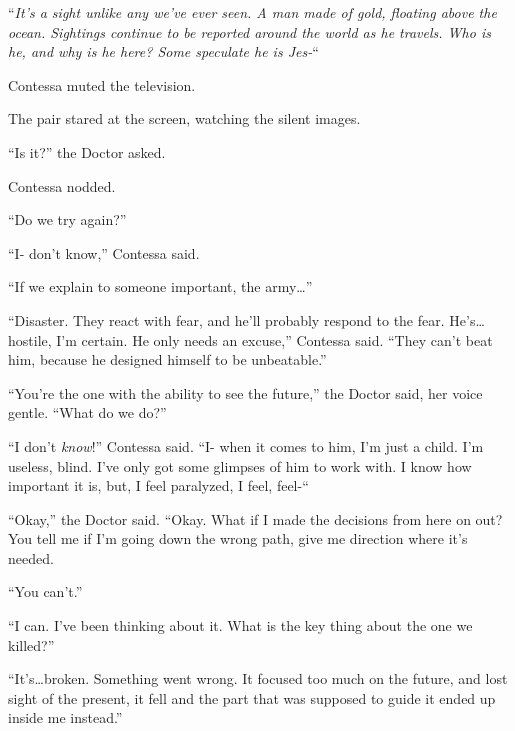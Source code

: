 \sectionbreak



``\emph{It's a sight unlike any we've ever seen.  A man made of gold, floating above the ocean.  Sightings continue to be reported around the world as he travels.  Who is he, and why is he here?  Some speculate he is Jes-}``



Contessa muted the television.



The pair stared at the screen, watching the silent images.



``Is it?''  the Doctor asked.



Contessa nodded.



``Do we try again?''



``I- don't know,'' Contessa said.



``If we explain to someone important, the army\ldots''



``Disaster.  They react with fear, and he'll probably respond to the fear.  He's\ldots hostile, I'm certain.  He only needs an excuse,'' Contessa said.  ``They can't beat him, because he designed himself to be unbeatable.''



``You're the one with the ability to see the future,'' the Doctor said, her voice gentle.  ``What do we do?''



``I don't \emph{know}!''  Contessa said.  ``I- when it comes to him, I'm just a child.  I'm useless, blind.  I've only got some glimpses of him to work with.  I know how important it is, but, I feel paralyzed, I feel, feel-``



``Okay,'' the Doctor said.  ``Okay.  What if I made the decisions from here on out?  You tell me if I'm going down the wrong path, give me direction where it's needed.



``You can't.''



``I can.  I've been thinking about it.  What is the key thing about the one we killed?''



``It's\ldots broken.  Something went wrong.  It focused too much on the future, and lost sight of the present, it fell and the part that was supposed to guide it ended up inside me instead.''




